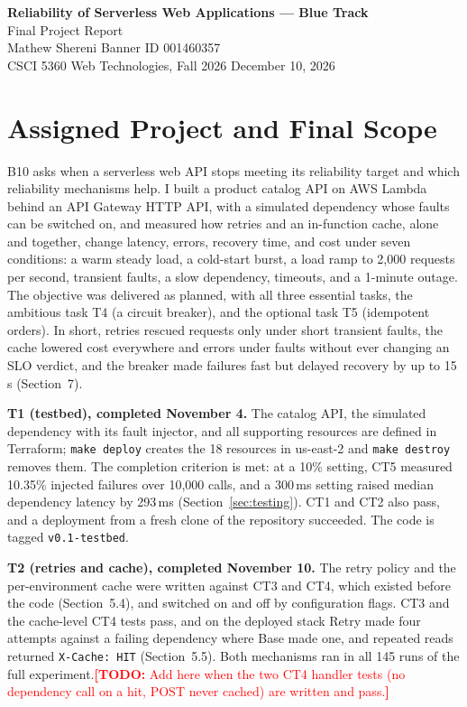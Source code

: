\documentclass[10pt]{article}
\newcommand{\todo}[1]{\textcolor{red}{\textbf{[TODO:} #1\textbf{]}}}
\begin{document}
\begin{center}
{\Large\bfseries Reliability of Serverless Web Applications --- Blue Track}\\[2pt]
{\large Final Project Report}\\[2pt]
Mathew Shereni \quad Banner ID 001460357\\
CSCI 5360 Web Technologies, Fall 2026 \quad December 10, 2026
\end{center}

\section{Assigned Project and Final Scope}
B10 asks when a serverless web API stops meeting its reliability target and
which reliability mechanisms help. I built a product catalog API on AWS Lambda
behind an API Gateway HTTP API, with a simulated dependency whose faults can be
switched on, and measured how retries and an in-function cache, alone and
together, change latency, errors, recovery time, and cost under seven
conditions: a warm steady load, a cold-start burst, a load ramp to 2{,}000
requests per second, transient faults, a slow dependency, timeouts, and a
1-minute outage. The objective was delivered as planned, with all three
essential tasks, the ambitious task T4 (a circuit breaker), and the optional
task T5 (idempotent orders). In short, retries rescued requests only under
short transient faults, the cache lowered cost everywhere and errors under
faults without ever changing an SLO verdict, and the breaker made failures fast
but delayed recovery by up to 15\,s (Section~7).

\textbf{T1 (testbed), completed November 4.} The catalog API, the simulated
dependency with its fault injector, and all supporting resources are defined in
Terraform; \texttt{make deploy} creates the 18 resources in us-east-2 and
\texttt{make destroy} removes them. The completion criterion is met: at a 10\%
setting, CT5 measured 10.35\% injected failures over 10{,}000 calls, and a
300\,ms setting raised median dependency latency by 293\,ms
(Section~\ref{sec:testing}). CT1 and CT2 also pass, and a deployment from a
fresh clone of the repository succeeded. The code is tagged
\texttt{v0.1-testbed}.

\textbf{T2 (retries and cache), completed November 10.} The retry policy and
the per-environment cache were written against CT3 and CT4, which existed
before the code (Section~5.4), and switched on and off by configuration flags.
CT3 and the cache-level CT4 tests pass, and on the deployed stack Retry made
four attempts against a failing dependency where Base made one, and repeated
reads returned \texttt{X-Cache:
HIT} (Section~5.5). Both mechanisms ran in all 145 runs of the full
experiment.\todo{Add here when the two CT4 handler tests (no dependency call on
a hit, POST never cached) are written and pass.}
\end{document}
